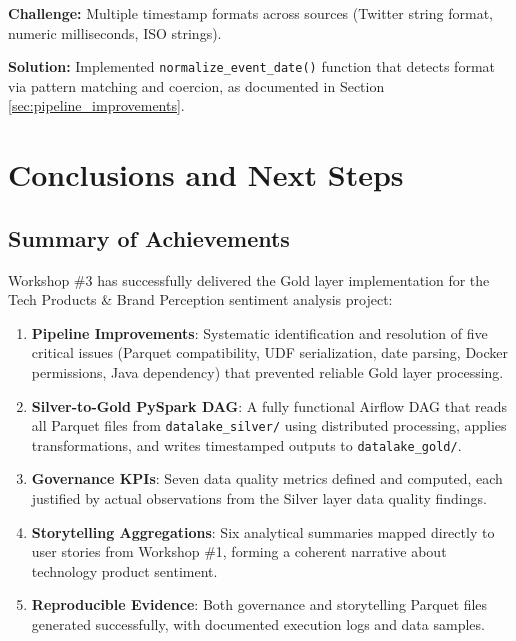 \documentclass[12pt]{article}
\begin{document}
\textbf{Challenge:} Multiple timestamp formats across sources (Twitter string format, numeric milliseconds, ISO strings).

\textbf{Solution:} Implemented \texttt{normalize\_event\_date()} function that detects format via pattern matching and coercion, as documented in Section \ref{sec:pipeline_improvements}.

\newpage

\section{Conclusions and Next Steps}
\label{sec:conclusions}

\subsection{Summary of Achievements}

Workshop \#3 has successfully delivered the Gold layer implementation for the Tech Products \& Brand Perception sentiment analysis project:

\begin{enumerate}
    \item \textbf{Pipeline Improvements}: Systematic identification and resolution of five critical issues (Parquet compatibility, UDF serialization, date parsing, Docker permissions, Java dependency) that prevented reliable Gold layer processing.
    
    \item \textbf{Silver-to-Gold PySpark DAG}: A fully functional Airflow DAG that reads all Parquet files from \texttt{datalake\_silver/} using distributed processing, applies transformations, and writes timestamped outputs to \texttt{datalake\_gold/}.
    
    \item \textbf{Governance KPIs}: Seven data quality metrics defined and computed, each justified by actual observations from the Silver layer data quality findings.
    
    \item \textbf{Storytelling Aggregations}: Six analytical summaries mapped directly to user stories from Workshop \#1, forming a coherent narrative about technology product sentiment.
    
    \item \textbf{Reproducible Evidence}: Both governance and storytelling Parquet files generated successfully, with documented execution logs and data samples.
\end{enumerate}
\end{document}
